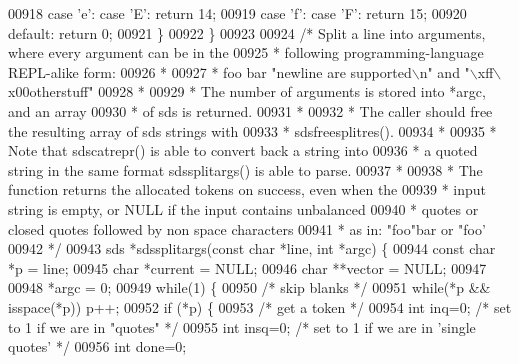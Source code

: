 \begin{DoxyCode}
{{{{{{{{{{{{{{{{00918     \textcolor{keywordflow}{case} \textcolor{stringliteral}{'e'}: \textcolor{keywordflow}{case} \textcolor{stringliteral}{'E'}: \textcolor{keywordflow}{return} 14;
00919     \textcolor{keywordflow}{case} \textcolor{stringliteral}{'f'}: \textcolor{keywordflow}{case} \textcolor{stringliteral}{'F'}: \textcolor{keywordflow}{return} 15;
00920     \textcolor{keywordflow}{default}: \textcolor{keywordflow}{return} 0;
00921     \}
00922 \}
00923 
00924 \textcolor{comment}{/* Split a line into arguments, where every argument can be in the}
00925 \textcolor{comment}{ * following programming-language REPL-alike form:}
00926 \textcolor{comment}{ *}
00927 \textcolor{comment}{ * foo bar "newline are supported\(\backslash\)n" and "\(\backslash\)xff\(\backslash\)x00otherstuff"}
00928 \textcolor{comment}{ *}
00929 \textcolor{comment}{ * The number of arguments is stored into *argc, and an array}
00930 \textcolor{comment}{ * of sds is returned.}
00931 \textcolor{comment}{ *}
00932 \textcolor{comment}{ * The caller should free the resulting array of sds strings with}
00933 \textcolor{comment}{ * sdsfreesplitres().}
00934 \textcolor{comment}{ *}
00935 \textcolor{comment}{ * Note that sdscatrepr() is able to convert back a string into}
00936 \textcolor{comment}{ * a quoted string in the same format sdssplitargs() is able to parse.}
00937 \textcolor{comment}{ *}
00938 \textcolor{comment}{ * The function returns the allocated tokens on success, even when the}
00939 \textcolor{comment}{ * input string is empty, or NULL if the input contains unbalanced}
00940 \textcolor{comment}{ * quotes or closed quotes followed by non space characters}
00941 \textcolor{comment}{ * as in: "foo"bar or "foo'}
00942 \textcolor{comment}{ */}
00943 sds *sdssplitargs(\textcolor{keyword}{const} \textcolor{keywordtype}{char} *line, \textcolor{keywordtype}{int} *argc) \{
00944     \textcolor{keyword}{const} \textcolor{keywordtype}{char} *p = line;
00945     \textcolor{keywordtype}{char} *current = NULL;
00946     \textcolor{keywordtype}{char} **vector = NULL;
00947 
00948     *argc = 0;
00949     \textcolor{keywordflow}{while}(1) \{
00950         \textcolor{comment}{/* skip blanks */}
00951         \textcolor{keywordflow}{while}(*p && isspace(*p)) p++;
00952         \textcolor{keywordflow}{if} (*p) \{
00953             \textcolor{comment}{/* get a token */}
00954             \textcolor{keywordtype}{int} inq=0;  \textcolor{comment}{/* set to 1 if we are in "quotes" */}
00955             \textcolor{keywordtype}{int} insq=0; \textcolor{comment}{/* set to 1 if we are in 'single quotes' */}
00956             \textcolor{keywordtype}{int} done=0;
}}}}}}}}}}}}}}}}
\end{DoxyCode}
